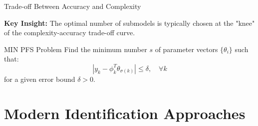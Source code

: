 \documentclass[aspectratio=169]{beamer}
\begin{document}
\begin{frame}{Trade-off Between Accuracy and Complexity}
\begin{center}
\end{center}

\textbf{Key Insight:} The optimal number of submodels is typically chosen at the "knee" of the complexity-accuracy trade-off curve.

\begin{alertblock}{MIN PFS Problem \cite{amaldi2002min}}
Find the minimum number $s$ of parameter vectors $\{\theta_i\}$ such that:
$$|y_k - \phi_k^T \theta_{\sigma(k)}| \leq \delta, \quad \forall k$$
for a given error bound $\delta > 0$.
\end{alertblock}
\end{frame}

\section{Modern Identification Approaches}
\end{document}
